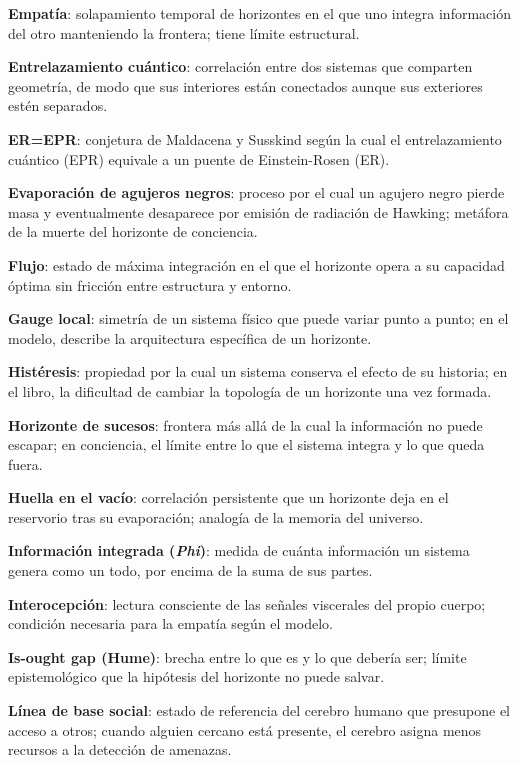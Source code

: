 \glos \textbf{Empatía}: solapamiento temporal de horizontes en el que uno integra información del otro manteniendo la frontera; tiene límite estructural.

\glos \textbf{Entrelazamiento cuántico}: correlación entre dos sistemas que comparten geometría, de modo que sus interiores están conectados aunque sus exteriores estén separados.

\glos \textbf{ER=EPR}: conjetura de Maldacena y Susskind según la cual el entrelazamiento cuántico (EPR) equivale a un puente de Einstein-Rosen (ER).

\glos \textbf{Evaporación de agujeros negros}: proceso por el cual un agujero negro pierde masa y eventualmente desaparece por emisión de radiación de Hawking; metáfora de la muerte del horizonte de conciencia.

\glos \textbf{Flujo}: estado de máxima integración en el que el horizonte opera a su capacidad óptima sin fricción entre estructura y entorno.

\glos \textbf{Gauge local}: simetría de un sistema físico que puede variar punto a punto; en el modelo, describe la arquitectura específica de un horizonte.

\glos \textbf{Histéresis}: propiedad por la cual un sistema conserva el efecto de su historia; en el libro, la dificultad de cambiar la topología de un horizonte una vez formada.

\glos \textbf{Horizonte de sucesos}: frontera más allá de la cual la información no puede escapar; en conciencia, el límite entre lo que el sistema integra y lo que queda fuera.

\glos \textbf{Huella en el vacío}: correlación persistente que un horizonte deja en el reservorio tras su evaporación; analogía de la memoria del universo.

\glos \textbf{Información integrada (}\textbf{\emph{Phi}}\textbf{)}: medida de cuánta información un sistema genera como un todo, por encima de la suma de sus partes.

\glos \textbf{Interocepción}: lectura consciente de las señales viscerales del propio cuerpo; condición necesaria para la empatía según el modelo.

\glos \textbf{Is-ought gap (Hume)}: brecha entre lo que es y lo que debería ser; límite epistemológico que la hipótesis del horizonte no puede salvar.

\glos \textbf{Línea de base social}: estado de referencia del cerebro humano que presupone el acceso a otros; cuando alguien cercano está presente, el cerebro asigna menos recursos a la detección de amenazas.

